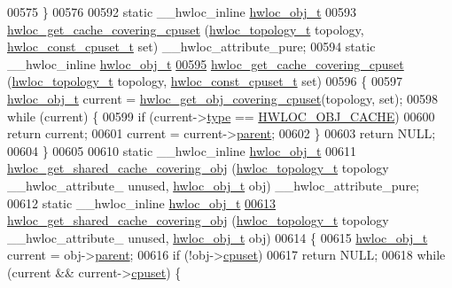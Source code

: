 \begin{DoxyCode}
00575 \}
00576 
00592 \textcolor{keyword}{static} \_\_hwloc\_inline \hyperlink{a00016}{hwloc_obj_t}
00593 \hyperlink{a00057_ga2f936fd9a9c62f6d9b9951de3062e889}{hwloc_get_cache_covering_cpuset} (\hyperlink{a00039_ga9d1e76ee15a7dee158b786c30b6a6e38}{hwloc_topology_t} topology, \hyperlink{a00040_ga1f784433e9b606261f62d1134f6a3b25}{hwloc_const_cpuset_t} 
      \textcolor{keyword}{set}) \_\_hwloc\_attribute\_pure;
00594 static \_\_hwloc\_inline \hyperlink{a00016}{hwloc_obj_t}
\hypertarget{a00031_source_l00595}{}\hyperlink{a00057_ga2f936fd9a9c62f6d9b9951de3062e889}{00595} \hyperlink{a00057_ga2f936fd9a9c62f6d9b9951de3062e889}{hwloc_get_cache_covering_cpuset} (\hyperlink{a00039_ga9d1e76ee15a7dee158b786c30b6a6e38}{hwloc_topology_t} topology, \hyperlink{a00040_ga1f784433e9b606261f62d1134f6a3b25}{hwloc_const_cpuset_t} 
      set)
00596 \{
00597   \hyperlink{a00016}{hwloc_obj_t} current = \hyperlink{a00055_ga68300dd0ee9c36a7a90f275a59e9af28}{hwloc_get_obj_covering_cpuset}(topology, \textcolor{keyword}{set});
00598   \textcolor{keywordflow}{while} (current) \{
00599     \textcolor{keywordflow}{if} (current->\hyperlink{a00016_acc4f0803f244867e68fe0036800be5de}{type} == \hyperlink{a00041_ggacd37bb612667dc437d66bfb175a8dc55a56ee0b7eca88f363b75b34fdde8c9ddc}{HWLOC_OBJ_CACHE})
00600       \textcolor{keywordflow}{return} current;
00601     current = current->\hyperlink{a00016_adc494f6aed939992be1c55cca5822900}{parent};
00602   \}
00603   \textcolor{keywordflow}{return} NULL;
00604 \}
00605 
00610 \textcolor{keyword}{static} \_\_hwloc\_inline \hyperlink{a00016}{hwloc_obj_t}
00611 \hyperlink{a00057_ga000e08a1da039130daa072e77713bb43}{hwloc_get_shared_cache_covering_obj} (\hyperlink{a00039_ga9d1e76ee15a7dee158b786c30b6a6e38}{hwloc_topology_t} topology \_\_hwloc\_attribute\_
      unused, \hyperlink{a00016}{hwloc_obj_t} obj) \_\_hwloc\_attribute\_pure;
00612 \textcolor{keyword}{static} \_\_hwloc\_inline \hyperlink{a00016}{hwloc_obj_t}
\hypertarget{a00031_source_l00613}{}\hyperlink{a00057_ga000e08a1da039130daa072e77713bb43}{00613} \hyperlink{a00057_ga000e08a1da039130daa072e77713bb43}{hwloc_get_shared_cache_covering_obj} (\hyperlink{a00039_ga9d1e76ee15a7dee158b786c30b6a6e38}{hwloc_topology_t} topology \_\_hwloc\_attribute\_
      unused, \hyperlink{a00016}{hwloc_obj_t} obj)
00614 \{
00615   \hyperlink{a00016}{hwloc_obj_t} current = obj->\hyperlink{a00016_adc494f6aed939992be1c55cca5822900}{parent};
00616   \textcolor{keywordflow}{if} (!obj->\hyperlink{a00016_a67925e0f2c47f50408fbdb9bddd0790f}{cpuset})
00617     \textcolor{keywordflow}{return} NULL;
00618   \textcolor{keywordflow}{while} (current && current->\hyperlink{a00016_a67925e0f2c47f50408fbdb9bddd0790f}{cpuset}) \{

\end{DoxyCode}
